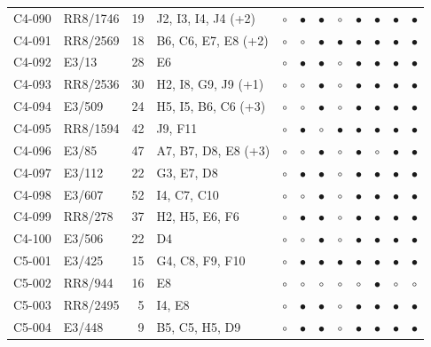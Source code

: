 {\begin{longtable}{llrp{3.9cm}cccccccc}
    C4-090 & RR8/1746 & 19 & J2, I3, I4, J4 (+2) & $\circ$ & $\bullet$ & $\bullet$ & $\circ$ & $\bullet$ & $\bullet$ & $\bullet$ & $\bullet$ \\
    C4-091 & RR8/2569 & 18 & B6, C6, E7, E8 (+2) & $\circ$ & $\circ$ & $\bullet$ & $\bullet$ & $\bullet$ & $\bullet$ & $\bullet$ & $\bullet$ \\
    C4-092 & E3/13 & 28 & E6 & $\circ$ & $\bullet$ & $\bullet$ & $\circ$ & $\bullet$ & $\bullet$ & $\bullet$ & $\bullet$ \\
    C4-093 & RR8/2536 & 30 & H2, I8, G9, J9 (+1) & $\circ$ & $\circ$ & $\bullet$ & $\circ$ & $\bullet$ & $\bullet$ & $\bullet$ & $\bullet$ \\
    C4-094 & E3/509 & 24 & H5, I5, B6, C6 (+3) & $\circ$ & $\circ$ & $\bullet$ & $\circ$ & $\bullet$ & $\bullet$ & $\bullet$ & $\bullet$ \\
    C4-095 & RR8/1594 & 42 & J9, F11 & $\circ$ & $\bullet$ & $\circ$ & $\bullet$ & $\bullet$ & $\bullet$ & $\bullet$ & $\bullet$ \\
    C4-096 & E3/85 & 47 & A7, B7, D8, E8 (+3) & $\circ$ & $\circ$ & $\bullet$ & $\circ$ & $\bullet$ & $\circ$ & $\bullet$ & $\bullet$ \\
    C4-097 & E3/112 & 22 & G3, E7, D8 & $\circ$ & $\bullet$ & $\bullet$ & $\circ$ & $\bullet$ & $\bullet$ & $\bullet$ & $\bullet$ \\
    C4-098 & E3/607 & 52 & I4, C7, C10 & $\circ$ & $\circ$ & $\bullet$ & $\circ$ & $\bullet$ & $\bullet$ & $\bullet$ & $\bullet$ \\
    C4-099 & RR8/278 & 37 & H2, H5, E6, F6 & $\circ$ & $\bullet$ & $\bullet$ & $\circ$ & $\bullet$ & $\bullet$ & $\bullet$ & $\bullet$ \\
    C4-100 & E3/506 & 22 & D4 & $\circ$ & $\circ$ & $\bullet$ & $\circ$ & $\bullet$ & $\bullet$ & $\bullet$ & $\bullet$ \\
    C5-001 & E3/425 & 15 & G4, C8, F9, F10 & $\circ$ & $\bullet$ & $\bullet$ & $\bullet$ & $\bullet$ & $\bullet$ & $\bullet$ & $\bullet$ \\
    C5-002 & RR8/944 & 16 & E8 & $\circ$ & $\circ$ & $\circ$ & $\circ$ & $\circ$ & $\bullet$ & $\circ$ & $\circ$ \\
    C5-003 & RR8/2495 & 5 & I4, E8 & $\circ$ & $\bullet$ & $\bullet$ & $\circ$ & $\bullet$ & $\bullet$ & $\bullet$ & $\bullet$ \\
    C5-004 & E3/448 & 9 & B5, C5, H5, D9 & $\circ$ & $\bullet$ & $\bullet$ & $\circ$ & $\bullet$ & $\bullet$ & $\bullet$ & $\bullet$ \\

\end{longtable}}
